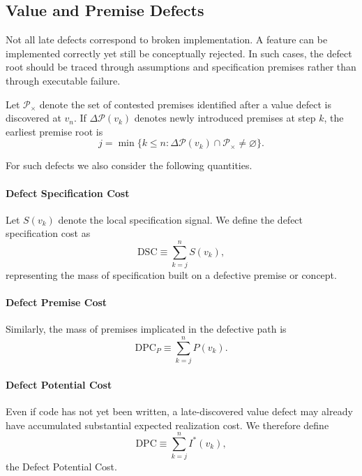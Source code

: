 \documentclass[twocolumn]{aastex701}
\begin{document}
\subsection{Value and Premise Defects}

Not all late defects correspond to broken implementation.
A feature can be implemented correctly yet still be conceptually rejected.
In such cases, the defect root should be traced through assumptions
and specification premises rather than through executable failure.

Let $\mathcal{P}_\times$ denote the set of contested premises identified
after a value defect is discovered at $v_n$.
If $\Delta \mathcal{P}(v_k)$ denotes newly introduced premises at step $k$,
the earliest premise root is
\begin{equation}
j = \min \{k \le n :
\Delta \mathcal{P}(v_k)\cap \mathcal{P}_\times \neq \varnothing \}.
\end{equation}

For such defects we also consider the following quantities.

\paragraph{Defect Specification Cost}

Let $S(v_k)$ denote the local specification signal.
We define the defect specification cost as
\begin{equation}
\mathrm{DSC} \equiv \sum_{k=j}^{n} S(v_k),
\end{equation}
representing the mass of specification built on a defective premise or concept.

\paragraph{Defect Premise Cost}

Similarly, the mass of premises implicated in the defective path is
\begin{equation}
\mathrm{DPC}_P \equiv \sum_{k=j}^{n} P(v_k).
\end{equation}

\paragraph{Defect Potential Cost}

Even if code has not yet been written, a late-discovered value defect
may already have accumulated substantial expected realization cost.
We therefore define
\begin{equation}
\mathrm{DPC} \equiv \sum_{k=j}^{n} I^\ast(v_k),
\end{equation}
the Defect Potential Cost.
\end{document}
